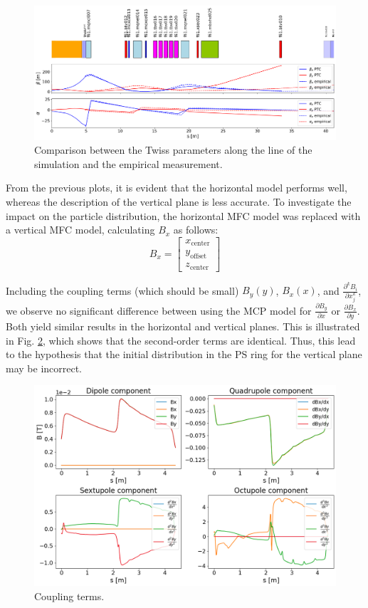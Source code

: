 \begin{figure}[H]
\centering
\includegraphics[width=1.0\textwidth]{02_Simulation/images/twiss_parameters_comparison.png}
\caption{Comparison between the Twiss parameters along the line of the simulation and the empirical measurement.}
\label{fig:twiss_params}
\end{figure}

From the previous plots, it is evident that the horizontal model performs well, whereas the description of the vertical plane is less accurate. To investigate the impact on the particle distribution, the horizontal MFC model was replaced with a vertical MFC model, calculating $B_{x}$ as follows:
\[
B_{x} = \begin{bmatrix}  
x_{\text{center}} \\  
y_{\text{offset}} \\
z_{\text{center}} 
\end{bmatrix}
\]

Including the coupling terms (which should be small) $B_{y}(y)$, $B_{x}(x)$, and $\frac{\partial^{k} B_{i}}{\partial x_{j}^{k}}$, we observe no significant difference between using the MCP model for $\frac{\partial B_{y}}{\partial x}$ or $\frac{\partial B_{x}}{\partial y}$. Both yield similar results in the horizontal and vertical planes. This is illustrated in Fig. \ref{fig:coupling_terms}, which shows that the second-order terms are identical. Thus, this lead to the hypothesis that the initial distribution in the PS ring for the vertical plane may be incorrect.

\begin{figure}[H]
\centering
\includegraphics[width=1.0\textwidth]{02_Simulation/images/coupling_terms.png}
\caption{Coupling terms.}
\label{fig:coupling_terms}
\end{figure}

